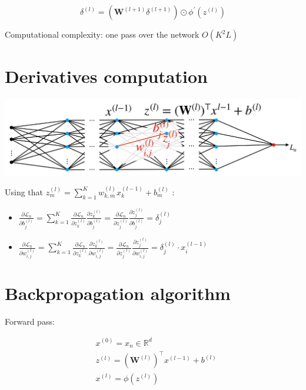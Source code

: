 \documentclass[10pt]{article}
\begin{document}
$$
\delta^{(l)}=\left(\mathbf{W}^{(l+1)} \delta^{(l+1)}\right) \odot \phi^{\prime}\left(z^{(l)}\right)
$$

Computational complexity: one pass over the network $O\left(K^{2} L\right)$

\section*{Derivatives computation}
\begin{center}
\includegraphics[max width=\textwidth]{2023_12_30_360102aa01a03e5a4270g-19}
\end{center}

Using that $z_{m}^{(l)}=\sum_{k=1}^{K} w_{k, m}^{(l)} x_{k}^{(l-1)}+b_{m}^{(l)}$ :

\begin{itemize}
  \item $\frac{\partial \mathscr{L}_{n}}{\partial b_{j}^{(l)}}=\sum_{k=1}^{K} \frac{\partial \mathscr{L}_{n}}{\partial z_{k}^{(l)}} \frac{\partial z_{k}^{(l)}}{\partial b_{j}^{(l)}}=\frac{\partial \mathscr{L}_{n}}{\partial z_{j}^{(l)}} \frac{\partial z_{j}^{(l)}}{\partial b_{j}^{(l)}}=\delta_{j}^{(l)}$

  \item $\frac{\partial \mathscr{L}_{n}}{\partial w_{i, j}^{(l)}}=\sum_{k=1}^{K} \frac{\partial \mathscr{L}_{n}}{\partial z_{k}^{(l)}} \frac{\partial z_{k}^{(l)}}{\partial w_{i, j}^{(l)}}=\frac{\partial \mathscr{L}_{n}}{\partial z_{j}^{(l)}} \frac{\partial z_{j}^{(l)}}{\partial w_{i, j}^{(l)}}=\delta_{j}^{(l)} \cdot x_{i}^{(l-1)}$

\end{itemize}

\section*{Backpropagation algorithm}
Forward pass:

$$
\begin{aligned}
& x^{(0)}=x_{n} \in \mathbb{R}^{d} \\
& z^{(l)}=\left(\mathbf{W}^{(l)}\right)^{\top} x^{(l-1)}+b^{(l)} \\
& x^{(l)}=\phi\left(z^{(l)}\right)
\end{aligned}
$$
\end{document}
